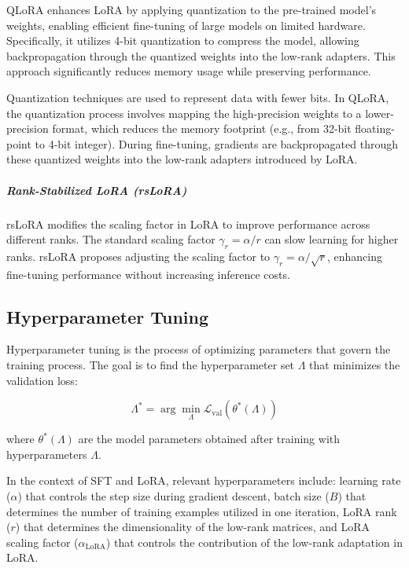 \documentclass{article}
\newcounter{para}
\begin{document}
QLoRA enhances LoRA by applying quantization to the pre-trained model's weights, enabling efficient fine-tuning of large models on limited hardware. Specifically, it utilizes 4-bit quantization to compress the model, allowing backpropagation through the quantized weights into the low-rank adapters. This approach significantly reduces memory usage while preserving performance.

Quantization techniques are used to represent data with fewer bits. In QLoRA, the quantization process involves mapping the high-precision weights to a lower-precision format, which reduces the memory footprint (e.g., from 32-bit floating-point to 4-bit integer). During fine-tuning, gradients are backpropagated through these quantized weights into the low-rank adapters introduced by LoRA.

\subparagraph{Rank-Stabilized LoRA (rsLoRA)} \label{sec:pre-rslora}

rsLoRA modifies the scaling factor in LoRA to improve performance across different ranks. The standard scaling factor \( \gamma_r = \alpha / r \) can slow learning for higher ranks. rsLoRA proposes adjusting the scaling factor to \( \gamma_r = \alpha / \sqrt{r} \), enhancing fine-tuning performance without increasing inference costs.

\subsection{Hyperparameter Tuning} \label{sec:pre-hyperparam-tuning}

Hyperparameter tuning is the process of optimizing parameters that govern the training process. The goal is to find the hyperparameter set \( \Lambda \) that minimizes the validation loss:

\[
\Lambda^* = \arg\min_{\Lambda} \mathcal{L}_{\text{val}}(\theta^*(\Lambda))
\]

where \( \theta^*(\Lambda) \) are the model parameters obtained after training with hyperparameters \( \Lambda \).

In the context of SFT and LoRA, relevant hyperparameters include: learning rate (\( \alpha \)) that controls the step size during gradient descent, batch size (\( B \)) that determines the number of training examples utilized in one iteration, LoRA rank (\( r \)) that determines the dimensionality of the low-rank matrices, and LoRA scaling factor (\( \alpha_{\text{LoRA}} \)) that controls the contribution of the low-rank adaptation in LoRA.
\end{document}
